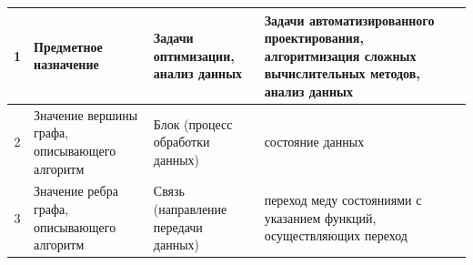 \begin{landscape}
\begin{longtable}{|c|p{}|p{}|p{}|}
    1          & Предметное назначение                                                                      & Задачи оптимизации, анализ данных                                                                                                                                                                                                                                                                                                                                                                                                                                                                                                                                                                                                               & Задачи автоматизированного проектирования, алгоритмизация сложных вычислительных методов, анализ данных                                                                                                                                                                           \\
    \hline
    2          & Значение вершины графа, описывающего алгоритм                                              & Блок (процесс обработки данных)                                                                                                                                                                                                                                                                                                                                                                                                                                                                                                                                                                                                                 & состояние данных                                                                                                                                                                                                                                                                  \\
    \hline
    3          & Значение ребра графа, описывающего алгоритм                                                & Связь (направление передачи данных)                                                                                                                                                                                                                                                                                                                                                                                                                                                                                                                                                                                                             & переход меду состояниями с указанием функций, осуществляющих переход                                                                                                                                                                                                              \\

\end{longtable}
\end{landscape}
